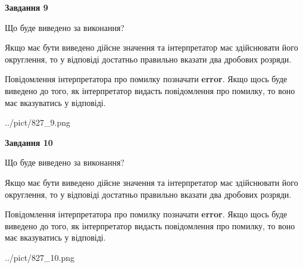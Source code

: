 \documentclass[12pt, ukrainian]{article}
\begin{document}
{\begin {Large}
{\begin {center}\textbf{Завдання 9}\end {center}}\par
Що буде виведено за виконання? \par

Якщо має бути виведено дійсне значення та інтерпретатор має здійснювати його округлення, 
то у відповіді достатньо правильно вказати два дробових розряди.

Повідомлення інтерпретатора про помилку позначати \textbf{error}.
Якщо щось буде виведено до того, як інтерпретатор видасть повідомлення про помилку, 
то воно має вказуватись у відповіді. \par

\begin{center}
	{../pict/827_9.png}
\end{center}
\newpage

{\begin {center}\textbf{Завдання 10}\end {center}}\par
Що буде виведено за виконання? \par

Якщо має бути виведено дійсне значення та інтерпретатор має здійснювати його округлення, 
то у відповіді достатньо правильно вказати два дробових розряди.

Повідомлення інтерпретатора про помилку позначати \textbf{error}.
Якщо щось буде виведено до того, як інтерпретатор видасть повідомлення про помилку, 
то воно має вказуватись у відповіді. \par

\begin{center}
	{../pict/827_10.png}
\end{center}
\newpage

\end {Large}}
\end{document}

